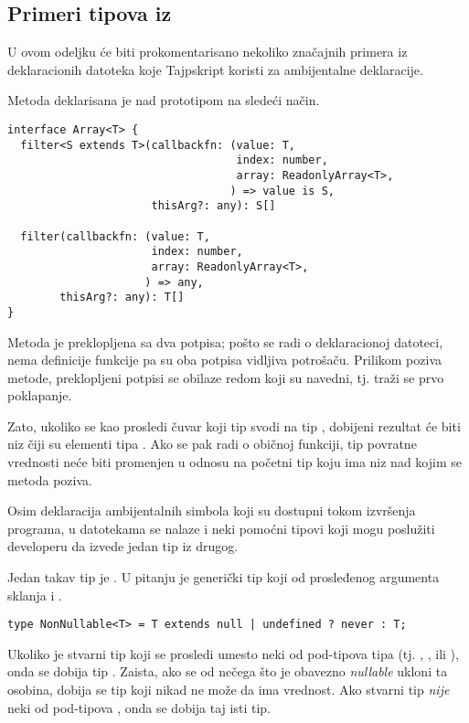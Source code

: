 \subsection{Primeri tipova iz }

U ovom odeljku će biti prokomentarisano nekoliko značajnih primera iz  deklaracionih datoteka koje Tajpskript koristi za ambijentalne deklaracije.

Metoda  deklarisana je nad prototipom  na sledeći način.

\begin{verbatim}
interface Array<T> {
  filter<S extends T>(callbackfn: (value: T,
                                   index: number,
                                   array: ReadonlyArray<T>,
                                  ) => value is S,
                      thisArg?: any): S[]

  filter(callbackfn: (value: T,
                      index: number,
                      array: ReadonlyArray<T>,
                     ) => any,
        thisArg?: any): T[]
}
\end{verbatim}

Metoda je preklopljena sa dva potpisa; pošto se radi o deklaracionoj  datoteci, nema definicije funkcije pa su oba potpisa vidljiva potrošaču.
Prilikom poziva metode, preklopljeni potpisi se obilaze redom koji su navedni, tj. traži se prvo poklapanje.

Zato, ukoliko se kao  prosledi čuvar koji tip  svodi na tip , dobijeni rezultat će biti niz čiji su elementi tipa .
Ako se pak radi o običnoj funkciji, tip povratne vrednosti neće biti promenjen u odnosu na početni tip koju ima niz nad kojim se metoda poziva.

Osim deklaracija ambijentalnih simbola koji su dostupni tokom izvršenja programa, u  datotekama se nalaze i neki pomoćni tipovi koji mogu poslužiti developeru da izvede jedan tip iz drugog.

Jedan takav tip je .
U pitanju je generički tip koji od prosleđenog argumenta sklanja  i .

\begin{verbatim}
type NonNullable<T> = T extends null | undefined ? never : T;
\end{verbatim}

Ukoliko je stvarni tip koji se prosledi umesto  neki od pod-tipova tipa  (tj. , ,  ili ), onda se dobija tip .
Zaista, ako se od nečega što je obavezno \textsl{nullable} ukloni ta osobina, dobija se tip koji nikad ne može da ima vrednost.
Ako stvarni tip \emph{nije} neki od pod-tipova , onda se dobija taj isti tip.

